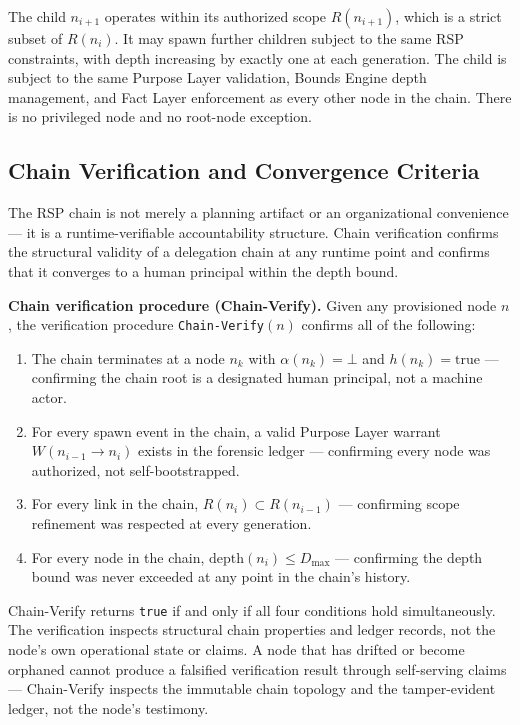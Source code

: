 The child $n_{i+1}$ operates within its authorized scope $R(n_{i+1})$, which is a strict subset of $R(n_i)$. It may spawn further children subject to the same RSP constraints, with depth increasing by exactly one at each generation. The child is subject to the same Purpose Layer validation, Bounds Engine depth management, and Fact Layer enforcement as every other node in the chain. There is no privileged node and no root-node exception.

\subsection{Chain Verification and Convergence Criteria}
\label{sec:rsp-convergence}

The RSP chain is not merely a planning artifact or an organizational convenience --- it is a runtime-verifiable accountability structure. Chain verification confirms the structural validity of a delegation chain at any runtime point and confirms that it converges to a human principal within the depth bound.

\medskip
\noindent\textbf{Chain verification procedure (Chain-Verify).} Given any provisioned node $n$, the verification procedure \texttt{Chain-Verify}$(n)$ confirms all of the following:

\begin{enumerate}
    \item[(V1)] The chain terminates at a node $n_k$ with $\alpha(n_k) = \bot$ and $h(n_k) = \mathrm{true}$ --- confirming the chain root is a designated human principal, not a machine actor.
    \item[(V2)] For every spawn event in the chain, a valid Purpose Layer warrant $W(n_{i-1} \to n_i)$ exists in the forensic ledger --- confirming every node was authorized, not self-bootstrapped.
    \item[(V3)] For every link in the chain, $R(n_i) \subset R(n_{i-1})$ --- confirming scope refinement was respected at every generation.
    \item[(V4)] For every node in the chain, $\mathrm{depth}(n_i) \leq D_{\max}$ --- confirming the depth bound was never exceeded at any point in the chain's history.
\end{enumerate}

Chain-Verify returns \texttt{true} if and only if all four conditions hold simultaneously. The verification inspects structural chain properties and ledger records, not the node's own operational state or claims. A node that has drifted or become orphaned cannot produce a falsified verification result through self-serving claims --- Chain-Verify inspects the immutable chain topology and the tamper-evident ledger, not the node's testimony.

